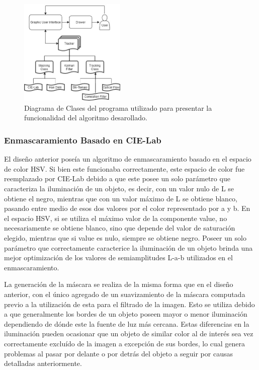 \begin{figure}[H]
	\centering
	\includegraphics[width=0.45\textwidth]{Imagenes/Classes.jpg}
	\caption{Diagrama de Clases del programa utilizado para presentar la funcionalidad del algoritmo desarollado.}
	\label{fig:class}
\end{figure}




















\subsubsection{Enmascaramiento Basado en CIE-Lab}

El diseño anterior poseía un algoritmo de enmascaramiento basado en el espacio de color HSV. Si bien este funcionaba correctamente, este espacio de color fue reemplazado por CIE-Lab debido a que este posee un solo parámetro que caracteriza la iluminación de un objeto, es decir, con un valor nulo de L se obtiene el negro, mientras que con un valor máximo de L se obtiene blanco, pasando entre medio de esos dos valores por el color representado por a y b. En el espacio HSV, si se utiliza el máximo valor de la componente value, no necesariamente se obtiene blanco, sino que depende del valor de saturación elegido, mientras que si value es nulo, siempre se obtiene negro. Poseer un solo parámetro que correctamente caracterice la iluminación de un objeto brinda una mejor optimización de los valores de semiamplitudes L-a-b utilizados en el enmascaramiento. 

La generación de la máscara se realiza de la misma forma que en el diseño anterior, con el único agregado de un suavizamiento de la máscara computada previo a la utilización de esta para el filtrado de la imagen. Esto se utiliza debido a que generalmente los bordes de un objeto poseen mayor o menor iluminación dependiendo de dónde este la fuente de luz más cercana. Estas diferencias en la iluminación pueden ocasionar que un objeto de similar color al de interés sea vez correctamente excluído de la imagen a excepción de sus bordes, lo cual genera problemas al pasar por delante o por detrás del objeto a seguir por causas detalladas anteriormente.

